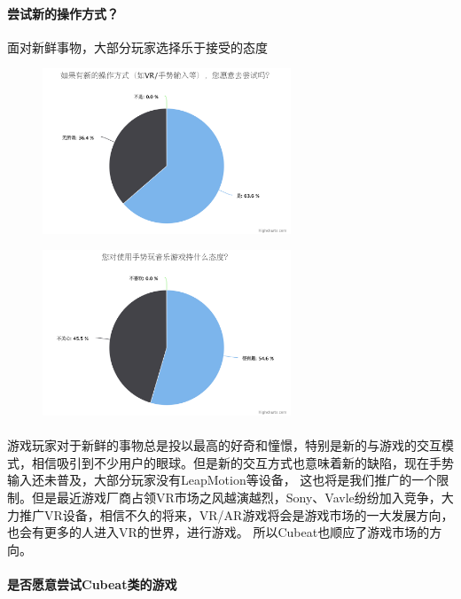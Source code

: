 \documentclass{article} \usepackage{CJK}
\begin{document}
\paragraph{尝试新的操作方式？}
面对新鲜事物，大部分玩家选择乐于接受的态度
\begin{figure}[H]
  \begin{minipage}{0.5\linewidth}
  \includegraphics[width=20em]{chart3.png}\\
  \caption{}\label{2-3}
\end{minipage}
\begin{minipage}{0.5\linewidth}
  \includegraphics[width=20em]{chart4.png}\\
  \caption{}\label{2-4}
\end{minipage}
\end{figure}
\paragraph{}
游戏玩家对于新鲜的事物总是投以最高的好奇和憧憬，特别是新的与游戏的交互模式，相信吸引到不少用户的眼球。但是新的交互方式也意味着新的缺陷，现在手势输入还未普及，大部分玩家没有LeapMotion等设备，
这也将是我们推广的一个限制。但是最近游戏厂商占领VR市场之风越演越烈，Sony、Vavle纷纷加入竞争，大力推广VR设备，相信不久的将来，VR/AR游戏将会是游戏市场的一大发展方向，也会有更多的人进入VR的世界，进行游戏。
所以Cubeat也顺应了游戏市场的方向。
\paragraph{是否愿意尝试Cubeat类的游戏}
\end{document}
